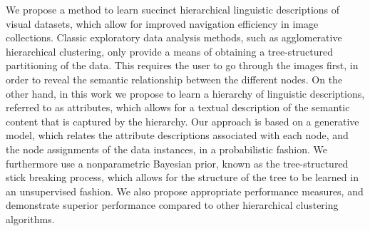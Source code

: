 We propose a method to learn succinct hierarchical linguistic descriptions of visual datasets, which allow for improved navigation efficiency in image
 collections. Classic exploratory data analysis methods, such as agglomerative
 hierarchical clustering, only provide a means of obtaining a tree-structured
 partitioning of the data. This requires the user to go through the images
 first, in order to reveal the semantic relationship between the different
 nodes. On the other hand, in this work we propose to learn a hierarchy of
 linguistic descriptions, referred to as attributes, which allows for a textual
 description of the semantic content that is captured by the hierarchy. Our
 approach is based on a generative model, which relates the attribute
 descriptions associated with each node, and the node assignments of the data
 instances, in a probabilistic fashion. We furthermore use a nonparametric
 Bayesian prior, known as the tree-structured stick breaking process, which
 allows for the structure of the tree to be learned in an unsupervised fashion.
 We also propose appropriate performance measures, and demonstrate superior
 performance compared to other hierarchical clustering algorithms.

